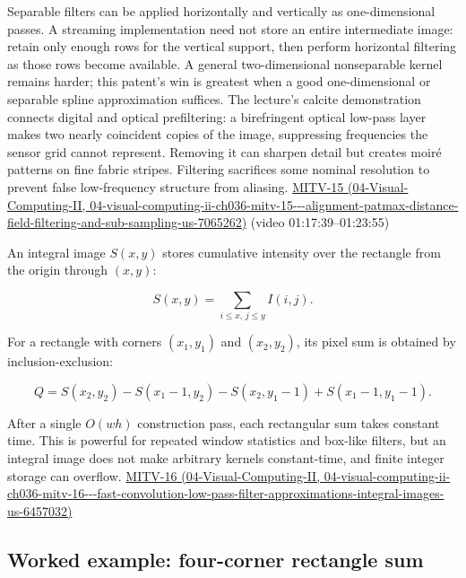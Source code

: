 Separable filters can be applied horizontally and vertically as one-dimensional passes. A streaming implementation need not store an entire intermediate image: retain only enough rows for the vertical support, then perform horizontal filtering as those rows become available. A general two-dimensional nonseparable kernel remains harder; this patent's win is greatest when a good one-dimensional or separable spline approximation suffices. The lecture's calcite demonstration connects digital and optical prefiltering: a birefringent optical low-pass layer makes two nearly coincident copies of the image, suppressing frequencies the sensor grid cannot represent. Removing it can sharpen detail but creates moiré patterns on fine fabric stripes. Filtering sacrifices some nominal resolution to prevent false low-frequency structure from aliasing. \href{../04-Visual-Computing-II/main.pdf\#nameddest=04-visual-computing-ii-ch036-mitv-15---alignment-patmax-distance-field-filtering-and-sub-sampling-us-7065262}{MITV-15 (04-Visual-Computing-II, 04-visual-computing-ii-ch036-mitv-15-\/-\/-alignment-patmax-distance-field-filtering-and-sub-sampling-us-7065262)} (video 01:17:39--01:23:55)

An integral image \(S(x,y)\) stores cumulative intensity over the rectangle from the origin through \((x,y)\):

\[
S(x,y)=\sum_{i\le x,\,j\le y}I(i,j).
\]

For a rectangle with corners \((x_1,y_1)\) and \((x_2,y_2)\), its pixel sum is obtained by inclusion-exclusion:

\[
Q=S(x_2,y_2)-S(x_1-1,y_2)-S(x_2,y_1-1)+S(x_1-1,y_1-1).
\]

After a single \(O(wh)\) construction pass, each rectangular sum takes constant time. This is powerful for repeated window statistics and box-like filters, but an integral image does not make arbitrary kernels constant-time, and finite integer storage can overflow. \href{../04-Visual-Computing-II/main.pdf\#nameddest=04-visual-computing-ii-ch036-mitv-16---fast-convolution-low-pass-filter-approximations-integral-images-us-6457032}{MITV-16 (04-Visual-Computing-II, 04-visual-computing-ii-ch036-mitv-16-\/-\/-fast-convolution-low-pass-filter-approximations-integral-images-us-6457032)}

\subsection{Worked example: four-corner rectangle sum}\label{03-visual-computing-i-ch004-worked-example-four-corner-rectangle-sum}

